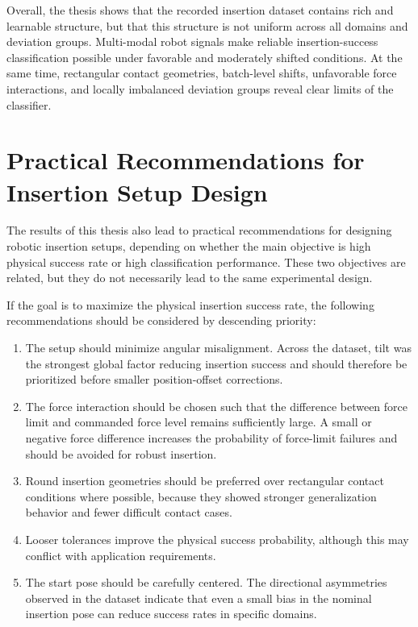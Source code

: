 Overall, the thesis shows that the recorded insertion dataset contains rich and learnable structure, but that this structure is not uniform across all domains and deviation groups. Multi-modal robot signals make reliable insertion-success classification possible under favorable and moderately shifted conditions. At the same time, rectangular contact geometries, batch-level shifts, unfavorable force interactions, and locally imbalanced deviation groups reveal clear limits of the classifier.

\section{Practical Recommendations for Insertion Setup Design}
\label{sec:practical_implications}

The results of this thesis also lead to practical recommendations for designing robotic insertion setups, depending on whether the main objective is high physical success rate or high classification performance. These two objectives are related, but they do not necessarily lead to the same experimental design.

If the goal is to maximize the physical insertion success rate, the following recommendations should be considered by descending priority:
\begin{enumerate}
    \item The setup should minimize angular misalignment. Across the dataset, tilt was the strongest global factor reducing insertion success and should therefore be prioritized before smaller position-offset corrections.
    \item The force interaction should be chosen such that the difference between force limit and commanded force level remains sufficiently large. A small or negative force difference increases the probability of force-limit failures and should be avoided for robust insertion.
    \item Round insertion geometries should be preferred over rectangular contact conditions where possible, because they showed stronger generalization behavior and fewer difficult contact cases.
    \item Looser tolerances improve the physical success probability, although this may conflict with application requirements.
    \item The start pose should be carefully centered. The directional asymmetries observed in the dataset indicate that even a small bias in the nominal insertion pose can reduce success rates in specific domains.
\end{enumerate}

